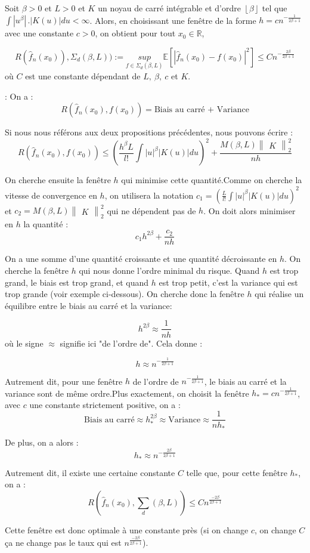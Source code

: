 \documentclass[
]{book}
\theoremstyle{definition}
\theoremstyle{definition}
\theoremstyle{definition}
\theoremstyle{definition}
\theoremstyle{remark}
\begin{document}
\begin{thm} Soit $\beta>0$ et $L>0$ et $K$ un noyau de carré intégrable et d'ordre $\left\lfloor{\beta}\right\rfloor$ tel que $\int |u^{\beta}|\,.|K(u)|du<\infty$. Alors, en choisissant une fenêtre de la forme $h=cn^{-\frac{1}{2\beta+1}}$ avec une constante $c>0$, on obtient pour tout $x_0 \in \mathbb{R}$,

$$ 
R(\hat {f}_n(x_0)),\Sigma_d(\beta, L)):= \underset{f\in\Sigma_d(\beta,L)}{sup}\mathbb{E}[|\hat {f}_n(x_0)-f(x_0)|^2]\leqslant Cn^{-\frac{2\beta}{2\beta+1}}
$$ 
 où $C$ est une constante dépendant de $L,~\beta,~ c$ et $K$.
 \end{thm}
\begin{demo}: 
  On a :
$$
 R(\hat {f}_n(x_0),f(x_0))= \text{Biais au carré + Variance}
$$ 

Si nous nous référons aux deux propositions précédentes, nous pouvons écrire :
$$
 R(\hat {f}_n(x_0),f(x_0))\leqslant(\frac{h^{\beta}L}{l!}\int |u|^{\beta}|K(u)|du)^2 + \frac{M(\beta,L)\begin{Vmatrix}K\end{Vmatrix}_2^2}{nh}
$$

On cherche ensuite la fenêtre $h$ qui minimise cette quantité.Comme on cherche la vitesse de convergence en $h$, on utilisera la notation $c_1=(\frac{L}{l!}\int |u|^{\beta}|K(u)|du)^2$ et $c_2=M(\beta,L)\begin{Vmatrix}K\end{Vmatrix}_2^2$ qui ne dépendent pas de $h$. On doit alors minimiser en $h$ la quantité :
$$
  c_1h^{2\beta}+\frac{c_2}{nh}
$$

On a une somme d'une quantité croissante et une quantité décroissante en $h$. On cherche la fenêtre $h$ qui nous donne l'ordre minimal du risque. Quand $h$ est trop grand, le biais est trop grand, et quand $h$ est trop petit, c'est la variance qui est trop grande (voir exemple ci-dessous). On cherche donc la fenêtre $h$ qui réalise un équilibre entre le biais au carré et la variance:

$$ 
  h^{2\beta}\approx\frac{1}{nh}
$$
où le signe $\approx$ signifie ici "de l'ordre de". Cela donne :

$$
  h\approx n^{-\frac{1}{2\beta +1}}
$$

Autrement dit, pour une fenêtre $h$ de l'ordre de $n^{-\frac{1}{2\beta+1}}$, le biais au carré et la variance sont de même ordre.Plus exactement, on choisit la fenêtre $h_*=cn^{-\frac{1}{2\beta+1}}$, avec $c$ une constante strictement positive, on a :
$$
  \text{Biais au carré} \approx h_{*}^{2\beta}\approx \text{Variance} \approx \frac{1}{nh_{*}}
$$

De plus, on a alors :
$$
  h_* \approx n^{-\frac{2\beta}{2\beta + 1}}
$$

Autrement dit, il existe une certaine constante $C$ telle que, pour cette fenêtre $h_*$, on a :
$$
  R(\hat {f}_n(x_0),\sum_d(\beta,L))\leqslant Cn^{\frac{-2\beta}{2\beta + 1}}
$$

  Cette fenêtre est donc optimale à une constante près (si on change $c$, on change $C$ ça ne change pas le taux qui est $n^{\frac{-2\beta}{2\beta+1}}$).\newline
\end{demo}
\end{document}
